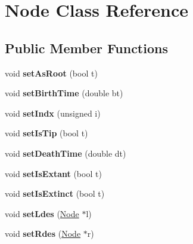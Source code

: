 \hypertarget{class_node}{}\section{Node Class Reference}
\label{class_node}
\subsection*{Public Member Functions}
\begin{DoxyCompactItemize}
\item 
\mbox{\label{class_node_a62827c35d0afab5a8cfdabda79186ae4}} 
void {\bfseries set\+As\+Root} (bool t)
\item 
\mbox{\label{class_node_acd09e75c41789d226719da8d95efebe1}} 
void {\bfseries set\+Birth\+Time} (double bt)
\item 
\mbox{\label{class_node_a0f391d528031893f7fbe52e72900309e}} 
void {\bfseries set\+Indx} (unsigned i)
\item 
\mbox{\label{class_node_a629a692ea9608a7c8fec4339c67358c0}} 
void {\bfseries set\+Is\+Tip} (bool t)
\item 
\mbox{\label{class_node_a5e35131ff2b821b1d99884078e70ac11}} 
void {\bfseries set\+Death\+Time} (double dt)
\item 
\mbox{\label{class_node_a644afbe040f8645c2e04139d88163951}} 
void {\bfseries set\+Is\+Extant} (bool t)
\item 
\mbox{\label{class_node_a80dc39531979676e86a490b51eb28215}} 
void {\bfseries set\+Is\+Extinct} (bool t)
\item 
\mbox{\label{class_node_a4d323defd428cc669a2f2ac774d757b3}} 
void {\bfseries set\+Ldes} (\mbox{\hyperlink{class_node}{Node}} $\ast$l)
\item 
\mbox{\label{class_node_a44d1a7fb375f4f5b4ba9cf663dd1fcef}} 
void {\bfseries set\+Rdes} (\mbox{\hyperlink{class_node}{Node}} $\ast$r)
\item 
\mbox{\label{class_node_a5cce7d833cae84af8e2cbb84c2e0ae59}} 

\end{DoxyCompactItemize}
